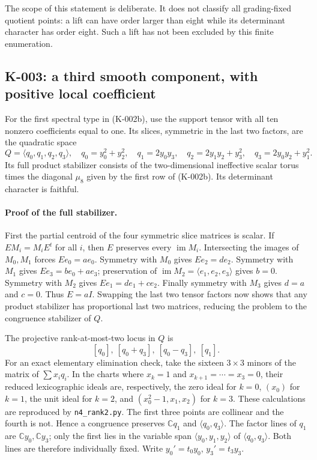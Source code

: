The scope of this statement is deliberate. It does not classify
all grading-fixed quotient points: a lift can have order larger than
eight while its determinant character has order eight. Such a lift
has not been excluded by this finite enumeration.

\subsection{K-003: a third smooth component, with positive local coefficient}
For the first spectral type in (K-002b), use the support tensor with
all ten nonzero coefficients equal to one. Its slices, symmetric in
the last two factors, are the quadratic space
\[
 Q=\langle q_0,q_1,q_2,q_3\rangle,
 \quad q_0=y_0^2+y_2^2,\quad q_1=2y_0y_3,\quad
 q_2=2y_1y_2+y_3^2,\quad q_3=2y_0y_2+y_1^2.                    \tag{K-003a}
\]
Its full product stabilizer consists of the two-dimensional
ineffective scalar torus times the diagonal $\mu_8$ given by the
first row of (K-002b). Its determinant character is faithful.

\paragraph{Proof of the full stabilizer.}
First the partial centroid of the four symmetric slice matrices is
scalar. If $EM_i=M_iE^t$ for all $i$, then $E$ preserves every
$\operatorname{im}M_i$. Intersecting the images of $M_0,M_1$ forces
$Ee_0=ae_0$. Symmetry with $M_0$ gives $Ee_2=de_2$.
Symmetry with $M_1$ gives $Ee_3=be_0+ae_3$; preservation of
$\operatorname{im}M_2=\langle e_1,e_2,e_3\rangle$ gives $b=0$.
Symmetry with $M_2$ gives $Ee_1=de_1+ce_2$.
Finally symmetry with $M_3$ gives $d=a$ and $c=0$.
Thus $E=aI$. Swapping the last two tensor factors now shows that any
product stabilizer has proportional last two matrices, reducing the
problem to the congruence stabilizer of $Q$.

The projective rank-at-most-two locus in $Q$ is
\[
 [q_0],\ [q_0+q_3],\ [q_0-q_3],\ [q_1].                       \tag{K-003b}
\]
For an exact elementary elimination check, take the sixteen $3\times3$
minors of the matrix of $\sum x_iq_i$. In the charts where $x_k=1$
and $x_{k+1}=\cdots=x_3=0$, their reduced lexicographic ideals are,
respectively, the zero ideal for $k=0$, $(x_0)$ for $k=1$, the unit
ideal for $k=2$, and $(x_0^2-1,x_1,x_2)$ for $k=3$.
These calculations are reproduced by \texttt{n4\_rank2.py}.
The first three points are collinear and the fourth is not. Hence a
congruence preserves $\mathbb Cq_1$ and $\langle q_0,q_3\rangle$.
The factor lines of $q_1$ are $\mathbb Cy_0,\mathbb Cy_3$; only the
first lies in the variable span $\langle y_0,y_1,y_2\rangle$ of
$\langle q_0,q_3\rangle$. Both lines are therefore individually fixed.
Write $y_0'=t_0y_0$, $y_3'=t_3y_3$.

